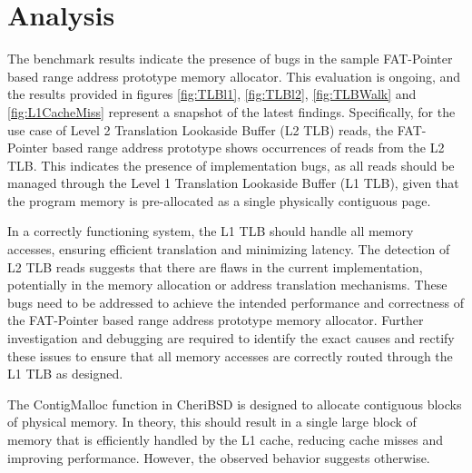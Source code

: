 
\section{Analysis}

The benchmark results indicate the presence of bugs in the sample FAT-Pointer based range address prototype memory allocator. This evaluation is ongoing, and the 
results provided in figures \ref{fig:TLBl1}, \ref{fig:TLBl2}, \ref{fig:TLBWalk} and \ref{fig:L1CacheMiss} represent a snapshot of the latest findings. Specifically, for the use case of Level 2 Translation Lookaside Buffer (L2 TLB) reads, 
the FAT-Pointer based range address prototype shows occurrences of reads from the L2 TLB. This indicates the presence of implementation bugs, 
as all reads should be managed through the Level 1 Translation Lookaside Buffer (L1 TLB), given that the program memory is pre-allocated as a single 
physically contiguous page.
\newline

In a correctly functioning system, the L1 TLB should handle all memory accesses, ensuring efficient translation and minimizing latency. 
The detection of L2 TLB reads suggests that there are flaws in the current implementation, potentially in the memory allocation or 
address translation mechanisms. These bugs need to be addressed to achieve the intended performance and correctness of the 
FAT-Pointer based range address prototype memory allocator. Further investigation and debugging are required to 
identify the exact causes and rectify these issues to ensure that all memory accesses are correctly routed 
through the L1 TLB as designed.
\newline

The ContigMalloc function in CheriBSD is designed to allocate contiguous blocks of physical memory. In theory, this should result in a single large block of memory 
that is efficiently handled by the L1 cache, reducing cache misses and improving performance. However, the observed behavior suggests otherwise.
\newline

